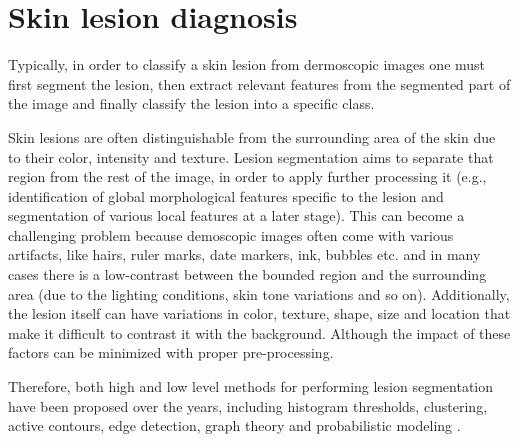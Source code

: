 \section{Skin lesion diagnosis}
    Typically, in order to classify a skin lesion from dermoscopic images one must first segment the lesion, then extract relevant features from the segmented part of the image and finally classify the lesion into a specific class. \par
    
    Skin lesions are often distinguishable from the surrounding area of the skin due to their color, intensity and texture. Lesion segmentation aims to separate that region from the rest of the image, in order to apply further processing it (e.g., identification of global morphological features specific to the lesion and segmentation of various local features at a later stage). This can become a challenging problem because  demoscopic images often come with various artifacts, like hairs, ruler marks, date markers, ink, bubbles etc. and in many cases there is a low-contrast between the bounded region and the surrounding area (due to the lighting conditions, skin tone variations and so on). Additionally, the lesion itself can have variations in color, texture, shape, size and location that make it difficult to contrast it with the background. Although the impact of these factors can be minimized with proper pre-processing.  \par
    
    Therefore, both high and low level methods for performing lesion segmentation have been proposed over the years, including histogram thresholds, clustering, active contours, edge detection, graph theory and probabilistic modeling \cite{?}. \par
    
